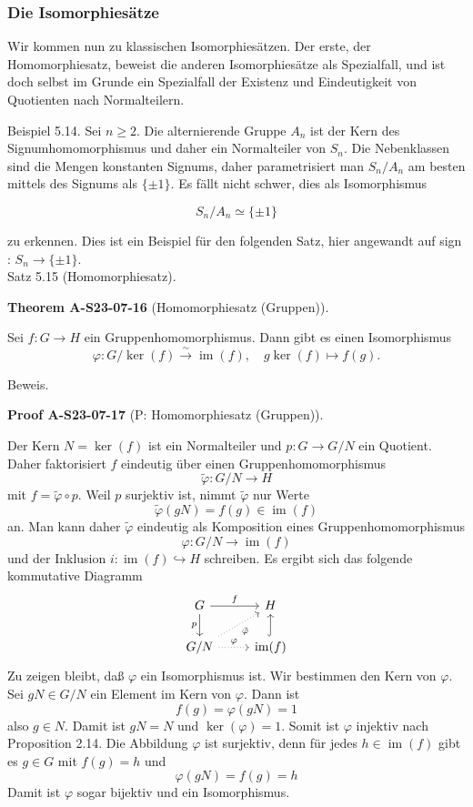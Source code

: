 \documentclass[10pt, letterpaper]{article}
\newcommand{\CustomHeading}[3]{%
  \par\medskip\noindent%
  \textbf{#1 #2} \textnormal{(#3)}.\enskip%
}
\newenvironment{THEO}[2]{\begin{unitbox}\CustomHeading{Theorem}{#1}{#2}}{\end{unitbox}}
\newenvironment{PROOF}[2]{\begin{unitbox}\CustomHeading{Proof}{#1}{#2}}{\end{unitbox}}
\begin{document}
\subsubsection{Die Isomorphiesätze} 

Wir kommen nun zu klassischen Isomorphiesätzen. Der erste, der Homomorphiesatz, beweist die anderen Isomorphiesätze als Spezialfall, und ist doch selbst im Grunde ein Spezialfall der Existenz und Eindeutigkeit von Quotienten nach Normalteilern.

Beispiel 5.14. Sei $n \geq 2$. Die alternierende Gruppe $A_{n}$ ist der Kern des Signumhomomorphismus und daher ein Normalteiler von $S_{n}$. Die Nebenklassen sind die Mengen konstanten Signums, daher parametrisiert man $S_{n} / A_{n}$ am besten mittels des Signums als $\{ \pm 1\}$. Es fällt nicht schwer, dies als Isomorphismus

$$
S_{n} / A_{n} \simeq\{ \pm 1\}
$$

zu erkennen. Dies ist ein Beispiel für den folgenden Satz, hier angewandt auf sign : $S_{n} \rightarrow\{ \pm 1\}$.\\



Satz 5.15 (Homomorphiesatz). 

\begin{THEO}{A-S23-07-16}{Homomorphiesatz (Gruppen)}
Sei $f: G \rightarrow H$ ein Gruppenhomomorphismus. Dann gibt es einen Isomorphismus
$$
\varphi: G / \operatorname{ker}(f) \xrightarrow{\sim} \operatorname{im}(f), \quad g \operatorname{ker}(f) \mapsto f(g) .
$$
\end{THEO}

Beweis. 

\begin{PROOF}{A-S23-07-17}{P: Homomorphiesatz (Gruppen)}
Der Kern $N=\operatorname{ker}(f)$ ist ein Normalteiler und $p: G \rightarrow G / N$ ein Quotient. Daher faktorisiert $f$ eindeutig über einen Gruppenhomomorphismus
$$
\tilde{\varphi}: G / N \rightarrow H
$$
mit $f=\tilde{\varphi} \circ p$. Weil $p$ surjektiv ist, nimmt $\tilde{\varphi}$ nur Werte
$$
\tilde{\varphi}(g N)=f(g) \in \operatorname{im}(f)
$$
an. Man kann daher $\tilde{\varphi}$ eindeutig als Komposition eines Gruppenhomomorphismus
$$
\varphi: G / N \rightarrow \operatorname{im}(f)
$$
und der Inklusion $i: \operatorname{im}(f) \hookrightarrow H$ schreiben. Es ergibt sich das folgende kommutative Diagramm
\[
\begin{tikzcd}
G \arrow[r, "f"] \arrow[d, "p"'] & H \\
G/N \arrow[r, dotted, "\varphi"] \arrow[ur, dotted, "\tilde{\varphi}"'] & \operatorname{im}(f) \arrow[u, hook]
\end{tikzcd}
\]
Zu zeigen bleibt, daß $\varphi$ ein Isomorphismus ist. Wir bestimmen den Kern von $\varphi$. Sei $g N \in G / N$ ein Element im Kern von $\varphi$. Dann ist
$$
f(g)=\varphi(g N)=1
$$
also $g \in N$. Damit ist $g N=N$ und $\operatorname{ker}(\varphi)=1$. Somit ist $\varphi$ injektiv nach Proposition 2.14.
Die Abbildung $\varphi$ ist surjektiv, denn für jedes $h \in \operatorname{im}(f)$ gibt es $g \in G$ mit $f(g)=h$ und
$$
\varphi(g N)=f(g)=h
$$
Damit ist $\varphi$ sogar bijektiv und ein Isomorphismus.
\end{PROOF}
\end{document}
